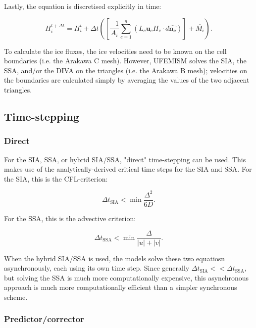 \documentclass{article}
\begin{document}
Lastly, the equation is discretised explicitly in time:

\begin{equation}
H_i^{t+\Delta t} = H_i^t + \Delta t \left( \left[ \frac{-1}{A_i} \sum_{c=1}^n \left( L_c \mathbf{u}_c H_c \cdot d\mathbf{\hat{n_c}} \right) \right] + \overline{M_i} \right).
\end{equation}

To calculate the ice fluxes, the ice velocities need to be known on the cell boundaries (i.e. the Arakawa C mesh). However, UFEMISM solves the SIA, the SSA, and/or the DIVA on the triangles (i.e. the Arakawa B mesh); velocities on the boundaries are calculated simply by averaging the values of the two adjacent triangles.

\newpage
\subsection{Time-stepping}

\subsubsection{Direct}

For the SIA, SSA, or hybrid SIA/SSA, "direct" time-stepping can be used. This makes use of the analytically-derived critical time steps for the SIA and SSA. For the SIA, this is the CFL-criterion:

\begin{equation} \label{eq:timestep_01}
\Delta t_{\textrm{SIA}} < \min \frac{\Delta^2}{6D}.
\end{equation}

For the SSA, this is the advective criterion:

\begin{equation} \label{eq:timestep_02}
\Delta t_{\textrm{SSA}} < \min \frac{\Delta}{|u| + |v|}.
\end{equation}

When the hybrid SIA/SSA is used, the models solve these two equatiosn asynchronously, each using its own time step. Since generally $\Delta t_{\textrm{SIA}} << \Delta t_{\textrm{SSA}}$, but solving the SSA is much more computationally expensive, this asynchronous approach is much more computationally efficient than a simpler synchronous scheme.

\subsubsection{Predictor/corrector}
\end{document}

